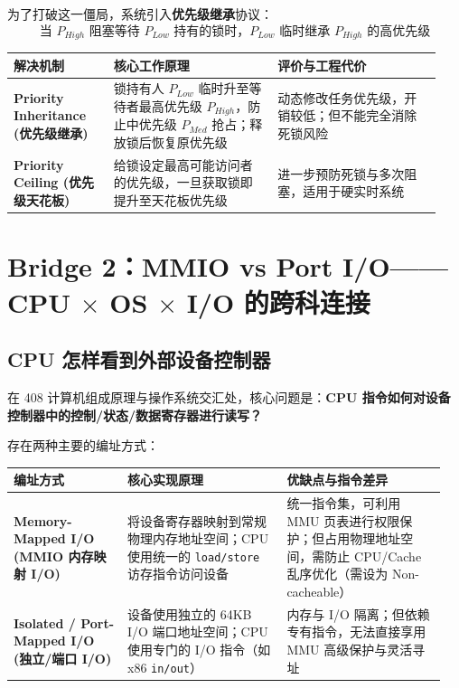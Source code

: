 \documentclass[11pt,a4paper]{ctexart}
\newcommand{\kw}[1]{\textbf{#1}}
\newcommand{\code}[1]{\texttt{#1}}
\begin{document}
为了打破这一僵局，系统引入\kw{优先级继承}协议：
\[
\boxed{
\text{当 } P_{High} \text{ 阻塞等待 } P_{Low} \text{ 持有的锁时，} P_{Low} \text{ 临时继承 } P_{High} \text{ 的高优先级}
}
\]

\begin{center}

\begingroup
\small
\renewcommand{\arraystretch}{1.25}
\setlength{\tabcolsep}{6pt}
\begin{tabularx}{\linewidth}{>{\bfseries}p{0.22\linewidth} p{0.36\linewidth} p{0.36\linewidth}}
\toprule
解决机制 & 核心工作原理 & 评价与工程代价\\
\midrule
Priority Inheritance (优先级继承) & 锁持有人 $P_{Low}$ 临时升至等待者最高优先级 $P_{High}$，防止中优先级 $P_{Med}$ 抢占；释放锁后恢复原优先级 & 动态修改任务优先级，开销较低；但不能完全消除死锁风险\\
Priority Ceiling (优先级天花板) & 给锁设定最高可能访问者的优先级，一旦获取锁即提升至天花板优先级 & 进一步预防死锁与多次阻塞，适用于硬实时系统\\
\bottomrule
\end{tabularx}
\endgroup
\end{center}

\section{Bridge 2：MMIO vs Port I/O——CPU $\times$ OS $\times$ I/O 的跨科连接}

\subsection{CPU 怎样看到外部设备控制器}

在 408 计算机组成原理与操作系统交汇处，核心问题是：\kw{CPU 指令如何对设备控制器中的控制/状态/数据寄存器进行读写？}

存在两种主要的编址方式：

\begingroup
\small
\renewcommand{\arraystretch}{1.25}
\setlength{\tabcolsep}{6pt}
\begin{tabularx}{\linewidth}{>{\bfseries}p{0.25\linewidth} p{0.35\linewidth} p{0.35\linewidth}}
\toprule
编址方式 & 核心实现原理 & 优缺点与指令差异\\
\midrule
Memory-Mapped I/O (MMIO 内存映射 I/O) & 将设备寄存器映射到常规物理内存地址空间；CPU 使用统一的 \code{load/store} 访存指令访问设备 & 统一指令集，可利用 MMU 页表进行权限保护；但占用物理地址空间，需防止 CPU/Cache 乱序优化（需设为 Non-cacheable）\\
Isolated / Port-Mapped I/O (独立/端口 I/O) & 设备使用独立的 64KB I/O 端口地址空间；CPU 使用专门的 I/O 指令（如 x86 \code{in/out}） & 内存与 I/O 隔离；但依赖专有指令，无法直接享用 MMU 高级保护与灵活寻址\\
\bottomrule
\end{tabularx}
\endgroup
\end{document}
